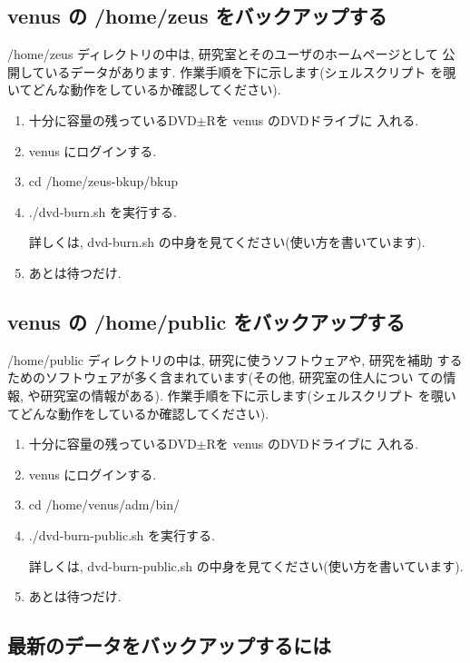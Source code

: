 \documentclass{jarticle}
\begin{document}
\subsection{venus の /home/zeus をバックアップする \label{sub:zs-b}}

/home/zeus ディレクトリの中は, 研究室とそのユーザのホームページとして
公開しているデータがあります. 作業手順を下に示します(シェルスクリプト
を覗いてどんな動作をしているか確認してください).

\begin{enumerate}
\item 十分に容量の残っているDVD$\pm$Rを venus のDVDドライブに
      入れる.
\item venus にログインする.
\item cd /home/zeus-bkup/bkup
\item ./dvd-burn.sh を実行する.

      詳しくは, dvd-burn.sh の中身を見てください(使い方を書いています).

\item あとは待つだけ.
\end{enumerate}

\subsection{venus の /home/public をバックアップする \label{sub:pc-b}}

/home/public ディレクトリの中は, 研究に使うソフトウェアや, 研究を補助
するためのソフトウェアが多く含まれています(その他, 研究室の住人につい
ての情報, や研究室の情報がある). 作業手順を下に示します(シェルスクリプト
を覗いてどんな動作をしているか確認してください).

\begin{enumerate}
\item 十分に容量の残っているDVD$\pm$Rを venus のDVDドライブに
      入れる.
\item venus にログインする.
\item cd /home/venus/adm/bin/
\item ./dvd-burn-public.sh を実行する.

      詳しくは, dvd-burn-public.sh の中身を見てください(使い方を書いています).

\item あとは待つだけ.
\end{enumerate}

\subsection{最新のデータをバックアップするには}
\end{document}
